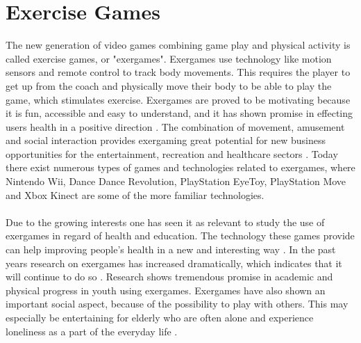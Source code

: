 \section{Exercise Games}
The new generation of video games combining game play and physical activity is called exercise games, or "exergames". Exergames use technology like motion sensors and remote control to track body movements. This requires the player to get up from the coach and physically move their body to be able to play the game, which stimulates exercise. Exergames are proved to be motivating because it is fun, accessible and easy to understand, and it has shown promise in effecting users health in a positive direction \cite{promotingexercise}. The combination of movement, amusement and social interaction provides exergaming great potential for new business opportunities for the entertainment, recreation and healthcare sectors \cite{gamingforhealth}. Today there exist numerous types of games and technologies related to exergames, where Nintendo Wii, Dance Dance Revolution, PlayStation EyeToy, PlayStation Move and Xbox Kinect are some of the more familiar technologies. \\ \\
Due to the growing interests one has seen it as relevant to study the use of exergames in regard of health and education. The technology these games provide can help improving people's health in a new and interesting way \cite{gamingforhealth}. In the past years research on exergames has increased dramatically, which indicates that it will continue to do so \cite{chamberlin2008exergames}. Research shows tremendous promise in academic and physical progress in youth using exergames. Exergames have also shown an important social aspect, because of the possibility to play with others. This may especially be entertaining for elderly who are often alone and experience loneliness as a part of the everyday life \cite{exergamesforelderly}. \\ \\
